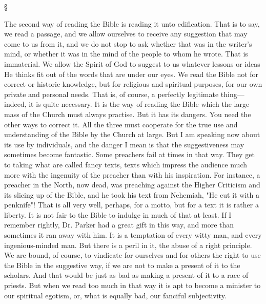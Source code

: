 \documentclass[12pt,letterpaper,oneside]{book}
\begin{document}
\begin{center}
\S
\end{center}

The second way of reading the Bible is reading 
it unto edification. That is to say, we read 
a passage, and we allow ourselves to receive 
any suggestion that may come to us from it, 
and we do not stop to ask whether that was in 
the writer's mind, or whether it was in the 
mind of the people to whom he wrote. That is 
immaterial. We allow the Spirit of God to 
suggest to us whatever lessons or ideas He 
thinks fit out of the words that are under our 
eyes. We read the Bible not for correct 
or historic knowledge, but for religious and 
spiritual purposes, for our own private and 
personal needs. That is, of course, a perfectly 
legitimate thing---indeed, it is quite necessary. 
It is the way of reading the Bible which the 
large mass of the Church must always practise. 
But it has its dangers. You need the other 
ways to correct it. All the three must cooperate 
for the true use and understanding of 
the Bible by the Church at large. But I am 
speaking now about its use by individuals, 
and the danger I mean is that the suggestiveness
may sometimes become fantastic. Some 
preachers fail at times in that way. They get 
to taking what are called fancy texts, texts 
which impress the audience much more with 
the ingenuity of the preacher than with his 
inspiration. For instance, a preacher in the 
North, now dead, was preaching against the 
Higher Criticism and its slicing up of the 
Bible, and he took his text from Nehemiah, 
"He cut it with a penknife"! That is all very 
well, perhaps, for a motto, but for a text it 
is rather a liberty. It is not fair to the Bible 
to indulge in much of that at least. If I remember 
rightly, Dr. Parker had a great gift in 
this way, and more than sometimes it ran away 
with him. It is a temptation of every witty 
man, and every ingenious-minded man. But 
there is a peril in it, the abuse of a right principle. 
We are bound, of course, to vindicate 
for ourselves and for others the right to use the 
Bible in the suggestive way, if we are not to 
make a present of it to the scholars. And that 
would be just as bad as making a present of it 
to a race of priests. But when we read too 
much in that way it is apt to become a minister 
to our spiritual egotism, or, what is equally bad, 
our fanciful subjectivity. 
\end{document}
